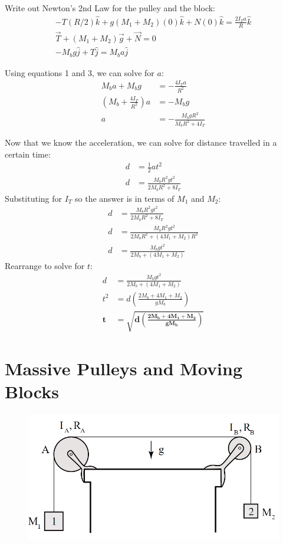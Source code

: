 \documentclass{article}
\begin{document}
Write out Newton's 2nd Law for the pulley and the block:
\begin{gather}
    -T(R/2)\hat{k}+g(M_1+M_2)(0)\hat{k}+N(0)\hat{k}=\frac{2I_Ta}{R}\hat{k}\\
    \vec{T}+(M_1+M_2)\vec{g}+\vec{N}=0\\
    -M_bg\hat{j}+T\hat{j}=M_ba\hat{j}
\end{gather}

Using equations 1 and 3, we can solve for $a$:
\begin{align*}
    M_ba+M_bg&=-\frac{4I_Ta}{R^{2}}\\
    \left(M_b+\frac{4I_T}{R^{2}}\right)a&=-M_bg\\
    a&=-\frac{M_bgR^{2}}{M_bR^{2}+4I_T}
\end{align*}

Now that we know the acceleration, we can solve for distance travelled in a
certain time:
\begin{align*}
    d&=\frac{1}{2}at^{2}\\
    d&=\frac{M_bR^{2}gt^{2}}{2M_bR^{2}+8I_T}
\end{align*}
Substituting for $I_{T}$ so the answer is in terms of $M_{1}$ and $M_{2}$:
\begin{align*}
    d&=\frac{M_bR^{2}gt^{2}}{2M_bR^{2}+8I_T}\\
    d&=\frac{M_bR^{2}gt^{2}}{2M_bR^{2}+(4M_{1}+M_{2})R^{2}}\\
    d&=\frac{M_bgt^{2}}{2M_b+(4M_{1}+M_{2})}
\end{align*}
Rearrange to solve for $t$:
\begin{align*}
    d&=\frac{M_bgt^{2}}{2M_b+(4M_{1}+M_{2})}\\
    t^{2}&=d\left(\frac{2M_b+4M_{1}+M_{2}}{gM_b}\right)\\
    \bm{t}&\bm{=\sqrt{d\left(\frac{2M_b+4M_{1}+M_{2}}{gM_b}\right)}}
\end{align*}

\section{Massive Pulleys and Moving Blocks}

\begin{figure}[H]
    \centering
    \includegraphics[scale=0.55]{"Figure 1"}
\end{figure}
\end{document}

